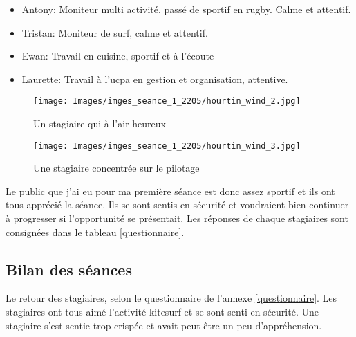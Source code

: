 \documentclass[12pt,a4paper]{report}
\begin{document}
\begin{itemize}
\item Antony: Moniteur multi activité, passé de sportif en rugby. Calme et attentif.
\item Tristan: Moniteur de surf, calme et attentif.
\item Ewan: Travail en cuisine, sportif et à l'écoute
\item Laurette: Travail à l'ucpa en gestion et organisation, attentive.
\end{itemize}
\begin{figure}
\begin{minipage}{0.4\textwidth}
\texttt{[image: Images/imges\_seance\_1\_2205/hourtin\_wind\_2.jpg]} 
\caption{Un stagiaire qui à l'air heureux}
\end{minipage}
\hfill
\begin{minipage}{0.4\textwidth}
\texttt{[image: Images/imges\_seance\_1\_2205/hourtin\_wind\_3.jpg]} 
\caption{Une stagiaire concentrée sur le pilotage}
\end{minipage}
\end{figure}
Le public que j'ai eu pour ma première séance est donc assez sportif
et ils ont tous apprécié la séance. Ils se sont sentis en sécurité
et voudraient bien continuer à progresser si l'opportunité se présentait.
Les réponses de chaque stagiaires sont consignées dans le tableau \ref{questionnaire}.



\subsection{Bilan des séances}
Le retour des stagiaires, selon le questionnaire de l'annexe \ref{questionnaire}.
Les stagiaires ont tous aimé l'activité kitesurf et se sont senti en sécurité.
Une stagiaire s'est sentie trop crispée et avait peut \^etre un peu d'appréhension.
\end{document}
